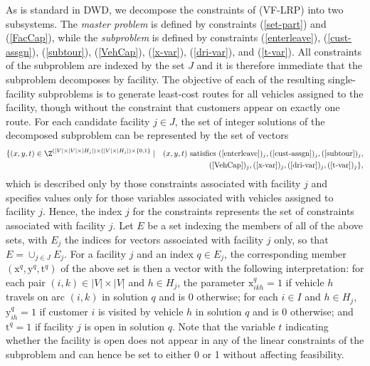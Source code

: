 As is standard in DWD, we decompose the constraints of (VF-LRP) into
two subsystems. The \emph{master problem} is defined by constraints
(\ref{set-part}) and (\ref{FacCap}), while the \emph{subproblem} is
defined by constraints (\ref{enterleave}), (\ref{cust-assgn}),
(\ref{subtour}), (\ref{VehCap}), (\ref{x-var}), (\ref{dri-var}), and
(\ref{t-var}). All constraints of the subproblem are indexed by the
set $J$ and it is therefore immediate that the subproblem decomposes
by facility. The objective of each of the resulting single-facility
subproblems is to generate least-cost routes for all vehicles assigned
to the facility, though without the constraint that customers appear
on exactly one route. For each candidate facility $j \in J$, the set
of integer solutions of the decomposed subproblem can be represented
by the set of vectors
\begin{eqnarray*}
\{(x, y, t) \in \Z^{(|V|\times |V| \times |H_j|) \times (|V| \times
  |H_j|) \times \{0, 1\}}  \mid & &   (x, y, t) \mbox{ satisfies } (\ref{enterleave})_j, 
 (\ref{cust-assgn})_j, (\ref{subtour})_j, \\
& & (\ref{VehCap})_j, (\ref{x-var})_j,
(\ref{dri-var})_j, (\ref{t-var})_j\},
\end{eqnarray*}
which is described only by those constraints associated with facility
$j$ and specifies values only for those variables associated with
vehicles assigned to facility $j$. Hence, the index $j$ for the
constraints represents the set of constraints associated with facility
$j$. Let $E$ be a set indexing the members of all of the above sets,
with $E_j$ the indices for vectors associated with facility $j$ only,
so that $E = \cup_{j \in J} E_j$. For a facility $j$ and an index $q
\in E_j$, the corresponding member $(\mbox{x}^q, \mbox{y}^q,
\mbox{t}^q)$ of the above set is then a vector with the following
interpretation: for each pair $(i, k) \in |V| \times |V|$ and $h \in
H_j$, the parameter $\mbox{x}_{ikh}^q = 1$ if vehicle $h$ travels on
arc $(i,k)$ in solution $q$ and is 0 otherwise; for each $i \in I$ and
$h \in H_j$, $\mbox{y}_{ih}^q = 1$ if customer $i$ is visited by
vehicle $h$ in solution $q$ and is 0 otherwise; and $\mbox{t}^q =1$ if
facility $j$ is open in solution $q$. Note that the variable $t$
indicating whether the facility is open does not appear in any of the
linear constraints of the subproblem and can hence be set to either 0
or 1 without affecting feasibility. 

